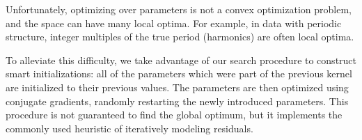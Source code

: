 \documentclass[twoside]{article}
\begin{document}
Unfortunately, optimizing over parameters is not a convex optimization problem, and the space can have many local optima.
For example, in data with periodic structure, integer multiples of the true period (\ie harmonics) are often local optima. 

To alleviate this difficulty, we take advantage of our search procedure to construct smart initializations: all of the parameters which were part of the previous kernel are initialized to their previous values.
The parameters are then optimized using conjugate gradients, randomly restarting the newly introduced parameters.
This procedure is not guaranteed to find the global optimum, but it implements the commonly used heuristic of iteratively modeling residuals\footnotemark.


\end{document}
